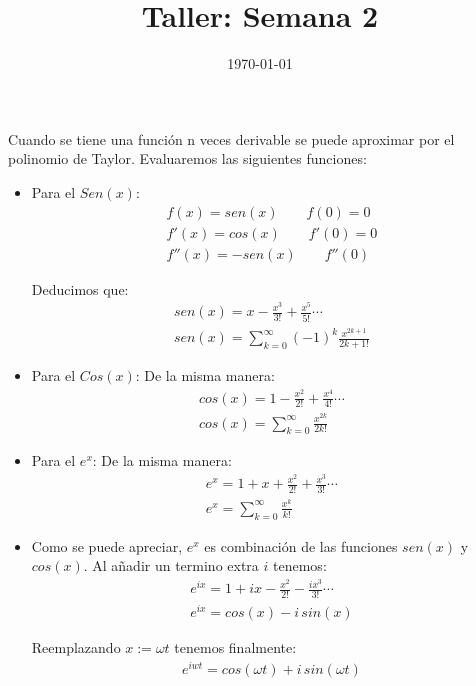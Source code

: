 \documentclass[a4paper]{article}
\date{\today}
\title{Taller: Semana 2}
\begin{document}
\header{}

\begin{answer}[Problema 1. y 2.]
    Cuando se tiene una función n veces derivable se puede aproximar por el polinomio de Taylor. Evaluaremos las siguientes funciones:
    \begin{itemize}
        \item Para el $Sen(x)$:
            \begin{align*}
                f(x) = sen(x)  \qquad f(0) = 0   \\
                f'(x) = cos(x)  \qquad f'(0) = 0  \\
                f''(x) = -sen(x) \qquad   f''(0) 
            \end{align*}

        Deducimos que:
        \begin{align*}
            sen(x) = x - \frac{x^3}{3!} + \frac{x^5}{5!} \dotsb \\
            sen(x) = \sum_{k=0}^{\infty} (-1)^k \frac{x^{2k+1}}{2k+1!}
        \end{align*}

        \item Para el $Cos(x)$:
        De la misma manera:
        \begin{align*}
            cos(x) = 1 - \frac{x^2}{2!} + \frac{x^4}{4!} \dotsb \\
            cos(x) = \sum_{k=0}^{\infty} \frac{x^{2k}}{2k!}
        \end{align*}

        \item Para el $e^x$:
        De la misma manera:
        \begin{align*}
            e^x = 1 + x + \frac{x^2}{2!} + \frac{x^3}{3!} \dotsb \\
            e^x = \sum_{k=0}^{\infty} \frac{x^{k}}{k!}
        \end{align*}

        \item Como se puede apreciar, $e^x$ es combinación de las funciones $sen(x)$ y $cos(x)$. Al añadir un termino extra $i$ tenemos:
        \begin{align*}
            e^{ix} = 1 + ix - \frac{x^2}{2!} - \frac{ix^3}{3!} \dotsb \\
            e^{ix} = cos(x) - i \, sin(x)
        \end{align*}
        
        Reemplazando $x := \omega t$ tenemos finalmente:
        \begin{align*}
            e^{iwt} = cos(\omega t) + i \, sin(\omega t)
        \end{align*}
    \end{itemize}
\end{answer}
\end{document}
